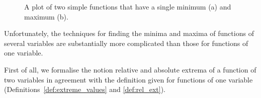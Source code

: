 \begin{figure}
\centering
\qquad
{}
\caption{A plot of two simple functions that have  a single  minimum (a) and maximum (b). \label{fig_multi_var_22}}
\end{figure}

Unfortunately, the techniques for finding the minima and maxima of functions of several variables are substantially more complicated than those for functions of one variable.

First of all, we formalise the notion relative and absolute extrema of a function of two variables in agreement with the definition given for functions of one variable (Definitions~\ref{def:extreme_values} and \ref{def:rel_ext}). 

